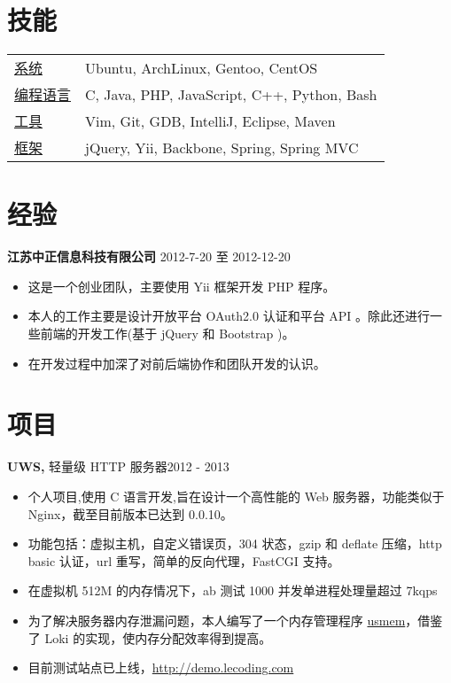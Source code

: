 \documentclass[margin]{res}
\begin{document}
 

\address{ 张启超 \\ }
\address{ 南京大学, 汉口路22号, 210093 \\ (+86) 152-9838-8316  \\ \href{http://lecoding.com}{http://lecoding.com} \\ 
\href{mailto:njuzhangqichao@gmail.com}{njuzhangqichao@gmail.com} }

 
\begin{resume} 
 
\section{技能} 
   \begin{tabular}{l p{3in}}
      \underline{系统} &  Ubuntu, ArchLinux, Gentoo, CentOS \\
      \underline{编程语言} &  C, Java, PHP, JavaScript, C++, Python, Bash \\
      \underline{工具} & Vim, Git, GDB, IntelliJ, Eclipse, Maven \\
      \underline{框架} & jQuery, Yii, Backbone, Spring, Spring MVC
 \end{tabular}

\section{经验} 
{\bf 江苏中正信息科技有限公司} \hfill 2012-7-20 至 2012-12-20 
\begin{itemize} \itemsep -2pt 
\item 这是一个创业团队，主要使用 Yii 框架开发 PHP 程序。
\item 本人的工作主要是设计开放平台 OAuth2.0 认证和平台 API 。除此还进行一些前端的开发工作(基于 jQuery 和 Bootstrap )。
\item 在开发过程中加深了对前后端协作和团队开发的认识。
\end{itemize}

\section{项目}
 {\bf UWS,} 轻量级 HTTP 服务器\hfill 2012 - 2013
 \begin{itemize} \itemsep -2pt

\item 个人项目,使用 C 语言开发,旨在设计一个高性能的 Web 服务器，功能类似于 Nginx，截至目前版本已达到 0.0.10。
\item 功能包括：虚拟主机，自定义错误页，304 状态，gzip 和 deflate 压缩，http basic 认证，url 重写，简单的反向代理，FastCGI 支持。
\item 在虚拟机 512M 的内存情况下，ab 测试 1000 并发单进程处理量超过 7kqps
\item 为了解决服务器内存泄漏问题，本人编写了一个内存管理程序 \href{https://github.com/usbuild/usmem}{usmem}，借鉴了 Loki 的实现，使内存分配效率得到提高。
\item 目前测试站点已上线，\href{http://demo.lecoding.com}{http://demo.lecoding.com}
\end{itemize}


\end{resume}
\end{document}
